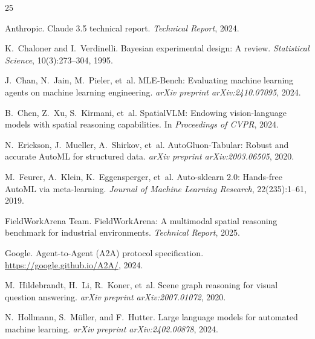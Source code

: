 \documentclass[11pt]{article}
\begin{document}
\small
\begin{thebibliography}{25}

Anthropic.
\newblock Claude 3.5 technical report.
\newblock \emph{Technical Report}, 2024.

K.~Chaloner and I.~Verdinelli.
\newblock Bayesian experimental design: A review.
\newblock \emph{Statistical Science}, 10(3):273--304, 1995.

J.~Chan, N.~Jain, M.~Pieler, et~al.
\newblock MLE-Bench: Evaluating machine learning agents on machine learning engineering.
\newblock \emph{arXiv preprint arXiv:2410.07095}, 2024.

B.~Chen, Z.~Xu, S.~Kirmani, et~al.
\newblock SpatialVLM: Endowing vision-language models with spatial reasoning capabilities.
\newblock In \emph{Proceedings of CVPR}, 2024.

N.~Erickson, J.~Mueller, A.~Shirkov, et~al.
\newblock AutoGluon-Tabular: Robust and accurate AutoML for structured data.
\newblock \emph{arXiv preprint arXiv:2003.06505}, 2020.

M.~Feurer, A.~Klein, K.~Eggensperger, et~al.
\newblock Auto-sklearn 2.0: Hands-free AutoML via meta-learning.
\newblock \emph{Journal of Machine Learning Research}, 22(235):1--61, 2019.

FieldWorkArena Team.
\newblock FieldWorkArena: A multimodal spatial reasoning benchmark for industrial environments.
\newblock \emph{Technical Report}, 2025.

Google.
\newblock Agent-to-Agent (A2A) protocol specification.
\newblock \url{https://google.github.io/A2A/}, 2024.

M.~Hildebrandt, H.~Li, R.~Koner, et~al.
\newblock Scene graph reasoning for visual question answering.
\newblock \emph{arXiv preprint arXiv:2007.01072}, 2020.

N.~Hollmann, S.~M{\"u}ller, and F.~Hutter.
\newblock Large language models for automated machine learning.
\newblock \emph{arXiv preprint arXiv:2402.00878}, 2024.


\end{thebibliography}
\end{document}
